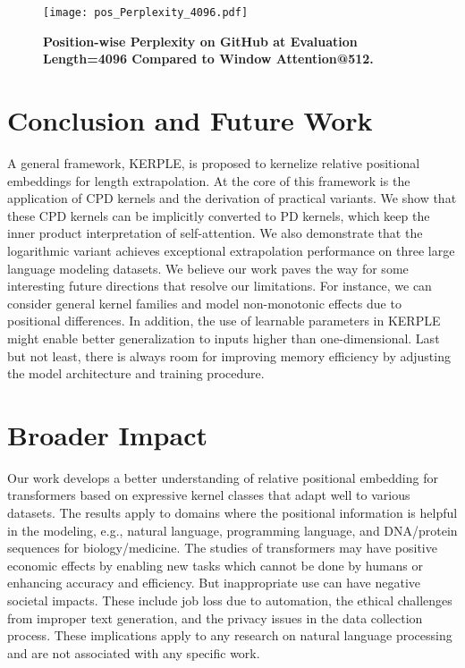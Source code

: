 \begin{figure}[!ht]
    \centering   
    \caption{\textbf{Position-wise Perplexity on GitHub at Evaluation Length=4096 Compared to Window Attention@512.}}
    {{\texttt{[image: pos\_Perplexity\_4096.pdf]} }}%
    \label{fig:pos-wise-ppl-window-4096}
\end{figure}

\section{Conclusion and Future Work}
\label{sec:conclusion}
A general framework, KERPLE, is proposed to kernelize relative positional embeddings for length extrapolation. At the core of this framework is the application of CPD kernels and the derivation of practical variants. We show that these CPD kernels can be implicitly converted to PD kernels, which keep the inner product interpretation of self-attention. We also demonstrate that the logarithmic variant achieves exceptional extrapolation performance on three large language modeling datasets. We believe our work paves the way for some interesting future directions that resolve our limitations. For instance, we can consider general kernel families and model non-monotonic effects due to positional differences. In addition, the use of learnable parameters in KERPLE might enable better generalization to inputs higher than one-dimensional. Last but not least, there is always room for improving memory efficiency by adjusting the model architecture and training procedure.

\section{Broader Impact}
\label{sec:broader_impact}
Our work develops a better understanding of relative positional embedding for transformers based on expressive kernel classes that adapt well to various datasets. The results apply to domains where the positional information is helpful in the modeling, e.g., natural language, programming language, and DNA/protein sequences for biology/medicine. The studies of transformers may have positive economic effects by enabling new tasks which cannot be done by humans or enhancing accuracy and efficiency. But inappropriate use can have negative societal impacts. These include job loss due to automation, the ethical challenges from improper text generation, and the privacy issues in the data collection process. These implications apply to any research on natural language processing and are not associated with any specific work.

